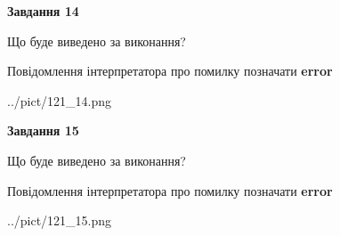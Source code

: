 \documentclass[11pt, ukrainian]{article}
\begin{document}
{\begin {large}
{\begin {center}\textbf{Завдання 14}\end {center}}\par
Що буде виведено за виконання? \par
Повідомлення інтерпретатора про помилку позначати \textbf{error}

\begin{center}
	{../pict/121_14.png}
\end{center}
\newpage

{\begin {center}\textbf{Завдання 15}\end {center}}\par
Що буде виведено за виконання? \par
Повідомлення інтерпретатора про помилку позначати \textbf{error}

\begin{center}
	{../pict/121_15.png}
\end{center}
\newpage

\end {large}}
\end{document}

